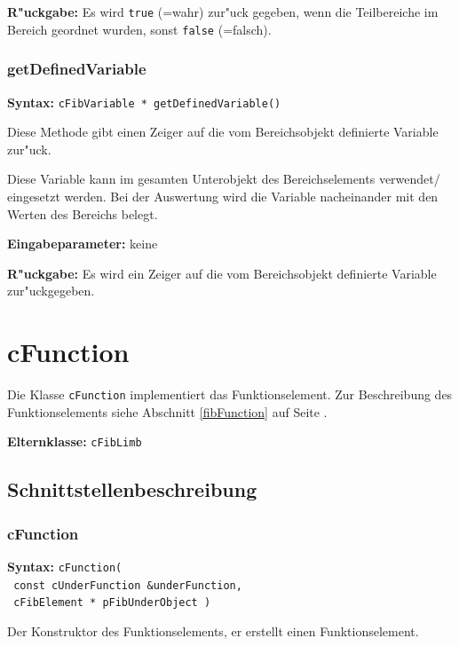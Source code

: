\bigskip\noindent
\textbf{R"uckgabe:} Es wird \verb|true| (=wahr) zur"uck gegeben, wenn die Teilbereiche im Bereich geordnet wurden, sonst \verb|false| (=falsch).


\subsubsection{getDefinedVariable}

\textbf{Syntax:} \verb|cFibVariable * getDefinedVariable()|

\bigskip\noindent
Diese Methode gibt einen Zeiger auf die vom Bereichsobjekt definierte Variable zur"uck.

Diese Variable kann im gesamten Unterobjekt des Bereichselements verwendet/ eingesetzt werden. Bei der Auswertung wird die Variable nacheinander mit den Werten des Bereichs belegt.

\bigskip\noindent
\textbf{Eingabeparameter:} keine

\bigskip\noindent
\textbf{R"uckgabe:} Es wird ein Zeiger auf die vom Bereichsobjekt definierte Variable zur"uckgegeben.


\section{cFunction}

Die Klasse \verb|cFunction| implementiert das Funktionselement.
Zur Beschreibung des Funktionselements siehe Abschnitt \ref{fibFunction} auf Seite \pageref{fibFunction} .

\bigskip\noindent
\textbf{Elternklasse:} \verb|cFibLimb|


\subsection{Schnittstellenbeschreibung}

\subsubsection{cFunction}

\textbf{Syntax:} \verb|cFunction(| \\\verb| const cUnderFunction &underFunction,| \\\verb| cFibElement * pFibUnderObject )|

\bigskip\noindent
Der Konstruktor des Funktionselements, er erstellt einen Funktionselement.

